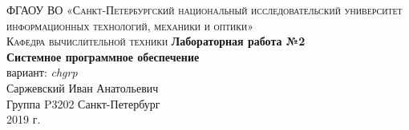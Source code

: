 \begin{titlepage}
\begin{center}

\textsc{ФГАОУ ВО «Санкт-Петербургский национальный исследовательский университет информационных технологий, механики и оптики»\\[4mm]
Кафедра вычислительной техники}
\vfill
\textbf{Лабораторная работа №2\\[4mm]
Системное программное обеспечение\\[4mm]
}
вариант: \textit{chgrp} \\[16mm]
Саржевский Иван Анатольевич
\\[2mm]Группа P3202
\vfill
Санкт-Петербург\\[2mm]
2019 г.

\end{center}
\end{titlepage}
